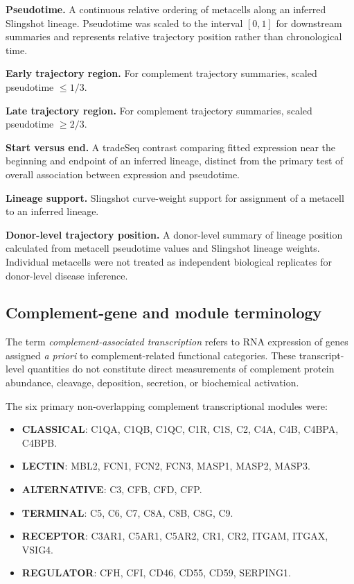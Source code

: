 \documentclass[10pt,letterpaper]{article}
\begin{document}
\textbf{Pseudotime.}
A continuous relative ordering of metacells along an inferred Slingshot lineage. Pseudotime was scaled to the interval $[0,1]$ for downstream summaries and represents relative trajectory position rather than chronological time.

\textbf{Early trajectory region.}
For complement trajectory summaries, scaled pseudotime $\leq 1/3$.

\textbf{Late trajectory region.}
For complement trajectory summaries, scaled pseudotime $\geq 2/3$.

\textbf{Start versus end.}
A tradeSeq contrast comparing fitted expression near the beginning and endpoint of an inferred lineage, distinct from the primary test of overall association between expression and pseudotime.

\textbf{Lineage support.}
Slingshot curve-weight support for assignment of a metacell to an inferred lineage.

\textbf{Donor-level trajectory position.}
A donor-level summary of lineage position calculated from metacell pseudotime values and Slingshot lineage weights. Individual metacells were not treated as independent biological replicates for donor-level disease inference.

\subsection*{Complement-gene and module terminology}

The term \textit{complement-associated transcription} refers to RNA expression of genes assigned \textit{a priori} to complement-related functional categories. These transcript-level quantities do not constitute direct measurements of complement protein abundance, cleavage, deposition, secretion, or biochemical activation.

The six primary non-overlapping complement transcriptional modules were:

\begin{itemize}
    \item \textbf{CLASSICAL}: C1QA, C1QB, C1QC, C1R, C1S, C2, C4A, C4B, C4BPA, C4BPB.
    \item \textbf{LECTIN}: MBL2, FCN1, FCN2, FCN3, MASP1, MASP2, MASP3.
    \item \textbf{ALTERNATIVE}: C3, CFB, CFD, CFP.
    \item \textbf{TERMINAL}: C5, C6, C7, C8A, C8B, C8G, C9.
    \item \textbf{RECEPTOR}: C3AR1, C5AR1, C5AR2, CR1, CR2, ITGAM, ITGAX, VSIG4.
    \item \textbf{REGULATOR}: CFH, CFI, CD46, CD55, CD59, SERPING1.
\end{itemize}
\end{document}
